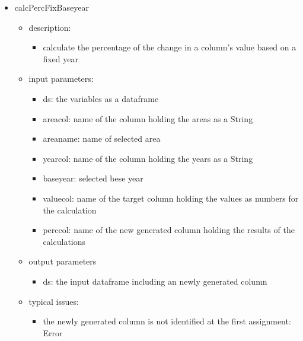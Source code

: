 \documentclass[11pt]{article}
\begin{document}
\begin{itemize}
\item calcPercFixBaseyear 
	\begin{itemize}
	\item description: 
		\begin{itemize}
		\item calculate the percentage of the change in a column's value based on a fixed year
		\end{itemize}
	\item input parameters: 
		\begin{itemize}
		\item ds: the variables as a dataframe
		\item areacol: name of the column holding the areas  as a String
		\item areaname: name of selected area
  		\item yearcol: name of the column holding the years as a String
		\item baseyear: selected bese year 
		\item valuecol:  name of the target column holding the values as numbers for the calculation
		\item perccol:  name of the new generated column holding the results of the calculations
		\end{itemize}
	\item output parameters
		\begin{itemize}
		\item ds: the input dataframe including an newly generated column 
		\end{itemize}
	\item typical issues:
		\begin{itemize}
		\item the newly generated column is not identified at the first assignment: Error
		\end{itemize}
	\end{itemize}


\end{itemize}
\end{document}
